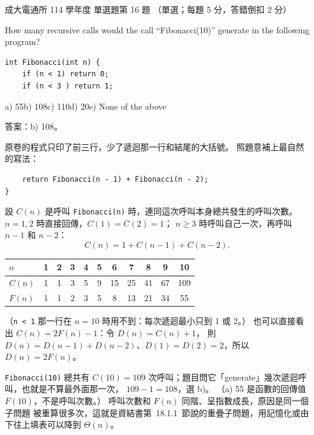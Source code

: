 \begin{pastexam}[label={px:ncku-114-cce-ds-16}]{成大電通所 114 學年度 單選題第 16 題}
（單選；每題 5 分，答錯倒扣 2 分）

How many recursive calls would the call ``Fibonacci(10)'' generate in the following program?
\begin{verbatim}
int Fibonacci(int n) {
    if (n < 1) return 0;
    if (n < 3 ) return 1;
\end{verbatim}
a) 55\quad b) 108\quad c) 110\quad d) 20\quad e) None of the above
\end{pastexam}

\begin{pastsoln}
答案：b) 108。

原卷的程式只印了前三行，少了遞迴那一行和結尾的大括號。 照題意補上最自然的寫法：
\begin{verbatim}
    return Fibonacci(n - 1) + Fibonacci(n - 2);
}
\end{verbatim}
設 $C(n)$ 是呼叫 \texttt{Fibonacci(n)} 時，連同這次呼叫本身總共發生的呼叫次數。 $n = 1, 2$ 時直接回傳，$C(1) = C(2) = 1$；
$n \ge 3$ 時呼叫自己一次，再呼叫 $n - 1$ 和 $n - 2$：
\[
C(n) = 1 + C(n - 1) + C(n - 2).
\]
\begin{center}
\begin{tabular}{l*{10}{c}}
\toprule
$n$ & 1 & 2 & 3 & 4 & 5 & 6 & 7 & 8 & 9 & 10 \\
\midrule
$C(n)$ & 1 & 1 & 3 & 5 & 9 & 15 & 25 & 41 & 67 & 109 \\
$F(n)$ & 1 & 1 & 2 & 3 & 5 & 8 & 13 & 21 & 34 & 55 \\
\bottomrule
\end{tabular}
\end{center}
（\texttt{n < 1} 那一行在 $n = 10$ 時用不到：每次遞迴最小只到 1 或 2。） 也可以直接看出 $C(n) = 2F(n) - 1$：令 $D(n) = C(n) + 1$，
則 $D(n) = D(n - 1) + D(n - 2)$、$D(1) = D(2) = 2$，所以 $D(n) = 2F(n)$。

\texttt{Fibonacci(10)} 總共有 $C(10) = 109$ 次呼叫；題目問它「generate」幾次遞迴呼叫，也就是不算最外面那一次，
$109 - 1 = 108$，選 b)。 （a) 55 是函數的回傳值 $F(10)$，不是呼叫次數。） 呼叫次數和 $F(n)$ 同階、呈指數成長，原因是同一個子問題
被重算很多次，這就是資結書第~18.1.1~節說的重疊子問題，用記憶化或由下往上填表可以降到 $\Theta(n)$。
\end{pastsoln}
